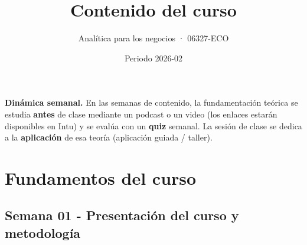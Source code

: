 \documentclass{article}
\title{Contenido del curso}
\author{Analítica para los negocios · 06327-ECO}
\date{Periodo 2026-02}
\begin{document}
\maketitle
\tableofcontents
\clearpage

\noindent\textbf{Dinámica semanal.} En las semanas de contenido, la fundamentación teórica se estudia \textbf{antes} de clase mediante un podcast o un video (los enlaces estarán disponibles en Intu) y se evalúa con un \textbf{quiz} semanal. La sesión de clase se dedica a la \textbf{aplicación} de esa teoría (aplicación guiada / taller).
\vspace{0.3cm}

\section{Fundamentos del curso}

\subsection{Semana 01 - Presentación del curso y metodología}
\vspace{0.2 cm}
\end{document}
